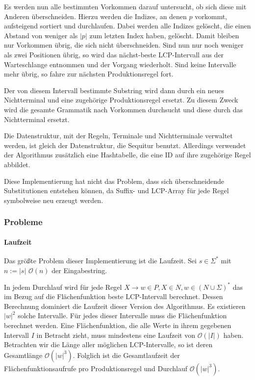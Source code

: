 Es werden nun alle bestimmten Vorkommen darauf untersucht, ob sich diese mit Anderen überschneiden. Hierzu werden die Indizes, an denen $p$ vorkommt, aufsteigend sortiert und durchlaufen. Dabei werden alle Indizes gelöscht, die einen Abstand von weniger als $|p|$ zum letzten Index haben, gelöscht. Damit bleiben nur Vorkommen übrig, die sich nicht überschneiden. Sind nun nur noch weniger als zwei Positionen übrig, so wird das nächst-beste LCP-Intervall aus der Warteschlange entnommen und der Vorgang wiederholt. Sind keine Intervalle mehr übrig, so fahre zur nächsten Produktionsregel fort.

Der von diesem Intervall bestimmte Substring wird dann durch ein neues Nichtterminal und eine zugehörige Produktionsregel ersetzt. Zu diesem Zweck wird die gesamte Grammatik nach Vorkommen durchsucht und diese durch das Nichtterminal ersetzt.

Die Datenstruktur, mit der Regeln, Terminale und Nichtterminale verwaltet werden, ist gleich der Datenstruktur, die Sequitur benutzt. Allerdings verwendet der Algorithmus zusätzlich eine Hashtabelle, die eine ID auf ihre zugehörige Regel abbildet.

Diese Implementierung hat nicht das Problem, dass sich überschneidende Substitutionen entstehen können, da Suffix- und LCP-Array für jede Regel symbolweise neu erzeugt werden. 

\subsubsection{Probleme}

\paragraph{Laufzeit}
Das größte Problem dieser Implementierung ist die Laufzeit. Sei $s \in \Sigma^*$ mit $n := |s|$ $\mathcal{O}(n)$ der Eingabestring.

In jedem Durchlauf wird für jede Regel $X \rightarrow w \in P, X \in N, w \in (N \cup \Sigma)^*$ das im Bezug auf die Flächenfunktion beste LCP-Intervall berechnet. Dessen Berechnung dominiert die Laufzeit dieser Version des Algorithmus. 
Es existieren $|w|^2$ solche Intervalle.
Für jedes dieser Intervalle muss die Flächenfunktion berechnet werden. Eine Flächenfunktion, die alle Werte in ihrem gegebenen Intervall $I$ in Betracht zieht, muss mindestens eine Laufzeit von $\mathcal{O}(|I|)$ haben. Betrachten wir die Länge aller möglichen LCP-Intervalle, so ist deren Gesamtlänge $\mathcal{O}(|w|^3)$. Folglich ist die Gesamtlaufzeit der Flächenfunktionsaufrufe pro Produktionsregel und Durchlauf $\mathcal{O}(|w|^3)$. 

